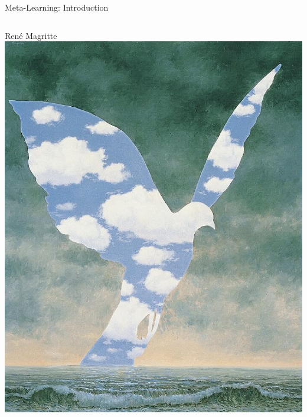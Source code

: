 \begin{frame}[c]{Meta-Learning: Introduction}

\begin{columns}
	Ren\'e Magritte
	\centering
	\includegraphics[width=1.0\textwidth]{w07_hpo_grey_box/images/meta_learning/magritte_1.jpg}

\end{columns}
\end{frame}
